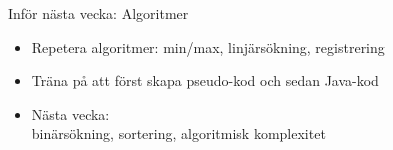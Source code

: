 \documentclass{lecturenotes}
\begin{document}
\begin{Slide}{Inför nästa vecka: Algoritmer}
\begin{itemize}
\item Repetera algoritmer: min/max, linjärsökning, registrering
\item Träna på att först skapa pseudo-kod och sedan Java-kod
\item Nästa vecka: \\ binärsökning, sortering, algoritmisk komplexitet
\end{itemize}
\end{Slide}
\end{document}
